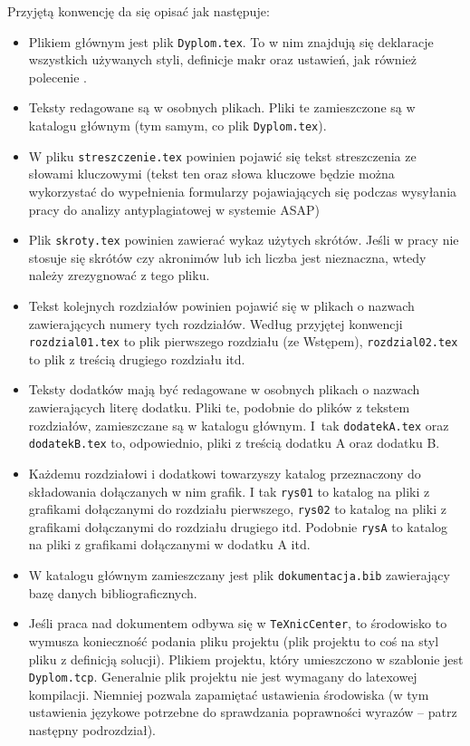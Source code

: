 Przyjętą konwencję da się opisać jak następuje:
\begin{itemize}
\item Plikiem głównym jest plik \texttt{Dyplom.tex}. To w nim znajdują się deklaracje wszystkich używanych styli, definicje makr oraz ustawień, jak również polecenie \verb++. 
\item Teksty redagowane są w osobnych plikach. Pliki te zamieszczone są w katalogu głównym (tym samym, co plik \texttt{Dyplom.tex}).
\item W pliku \texttt{streszczenie.tex} powinien pojawić się tekst streszczenia ze słowami kluczowymi (tekst ten oraz słowa kluczowe będzie można wykorzystać do wypełnienia formularzy pojawiających się podczas wysyłania pracy do analizy antyplagiatowej w systemie ASAP)
\item Plik \texttt{skroty.tex} powinien zawierać wykaz użytych skrótów. Jeśli w pracy nie stosuje się skrótów czy akronimów lub ich liczba jest nieznaczna, wtedy należy zrezygnować z tego pliku. 
\item Tekst kolejnych rozdziałów powinien pojawić się w plikach o nazwach zawierających numery tych rozdziałów. Według przyjętej konwencji \texttt{rozdzial01.tex} to plik pierwszego rozdziału (ze Wstępem), \texttt{rozdzial02.tex} to plik z treścią drugiego rozdziału itd. 
\item Teksty dodatków mają być redagowane w osobnych plikach o nazwach zawierających literę dodatku. Pliki te, podobnie do plików z tekstem rozdziałów, zamieszczane są w katalogu głównym. I~tak \texttt{dodatekA.tex} oraz \texttt{dodatekB.tex} to, odpowiednio, pliki z treścią dodatku A oraz dodatku B.
\item Każdemu rozdziałowi i dodatkowi towarzyszy katalog przeznaczony do składowania dołączanych w nim grafik. I tak \texttt{rys01} to katalog na pliki z grafikami dołączanymi do rozdziału pierwszego, \texttt{rys02} to katalog na pliki z grafikami dołączanymi do rozdziału drugiego itd.
Podobnie \texttt{rysA} to katalog na pliki z grafikami dołączanymi w dodatku A itd.
\item W katalogu głównym zamieszczany jest plik \texttt{dokumentacja.bib} zawierający bazę danych bibliograficznych.
\item Jeśli praca nad dokumentem odbywa się w \texttt{TeXnicCenter}, to środowisko to wymusza konieczność podania pliku projektu (plik projektu to coś na styl pliku z definicją solucji). Plikiem projektu, który umieszczono w szablonie jest \texttt{Dyplom.tcp}. Generalnie plik projektu nie jest wymagany do latexowej kompilacji. Niemniej pozwala zapamiętać ustawienia środowiska (w tym ustawienia językowe potrzebne do sprawdzania poprawności wyrazów -- patrz następny podrozdział).  
\end{itemize}

